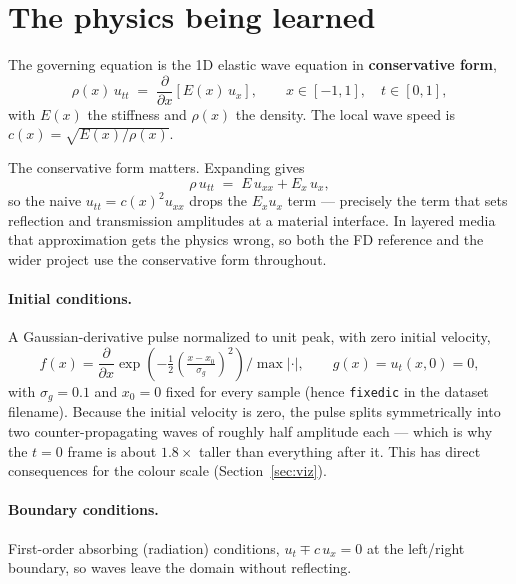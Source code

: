 \documentclass[11pt,a4paper]{article}
\begin{document}
\clearpage

\section{The physics being learned}

The governing equation is the 1D elastic wave equation in \textbf{conservative
form},
\begin{equation}
\rho(x)\,u_{tt} \;=\; \frac{\partial}{\partial x}\!\left[E(x)\,u_x\right],
\qquad x\in[-1,1],\quad t\in[0,1],
\end{equation}
with $E(x)$ the stiffness and $\rho(x)$ the density. The local wave speed is
$c(x)=\sqrt{E(x)/\rho(x)}$.

The conservative form matters. Expanding gives
\begin{equation}
\rho\,u_{tt} \;=\; E\,u_{xx} + E_x\,u_x ,
\end{equation}
so the naive $u_{tt}=c(x)^2u_{xx}$ drops the $E_x u_x$ term --- precisely the
term that sets reflection and transmission amplitudes at a material interface.
In layered media that approximation gets the physics wrong, so both the FD
reference and the wider project use the conservative form throughout.

\paragraph{Initial conditions.} A Gaussian-derivative pulse normalized to unit
peak, with zero initial velocity,
\begin{equation}
f(x)=\frac{\partial}{\partial x}\exp\!\left(-\tfrac12\left(\tfrac{x-x_0}{\sigma_g}\right)^{2}\right)
\Big/ \max|\cdot| ,
\qquad g(x)=u_t(x,0)=0,
\end{equation}
with $\sigma_g=0.1$ and $x_0=0$ fixed for every sample (hence \texttt{fixedic}
in the dataset filename). Because the initial velocity is zero, the pulse splits
symmetrically into two counter-propagating waves of roughly half amplitude each
--- which is why the $t=0$ frame is about $1.8\times$ taller than everything
after it. This has direct consequences for the colour scale
(Section~\ref{sec:viz}).

\paragraph{Boundary conditions.} First-order absorbing (radiation) conditions,
$u_t \mp c\,u_x = 0$ at the left/right boundary, so waves leave the domain
without reflecting.
\end{document}

